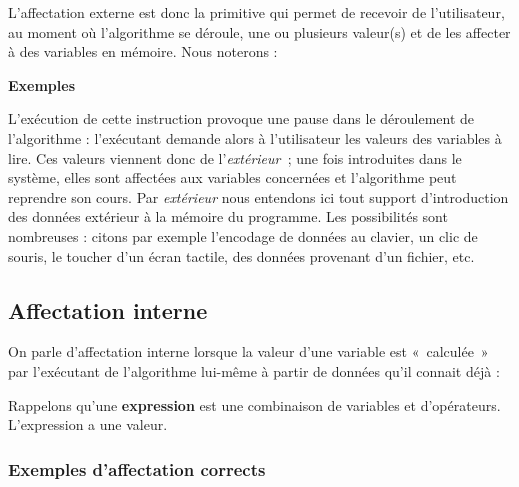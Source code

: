 			L’affectation externe est donc la primitive qui permet de recevoir de
			l’utilisateur, au moment où l'algorithme se déroule,
			une ou plusieurs valeur(s) et de les affecter à des variables en
			mémoire. Nous noterons :

			
			{\bfseries Exemples}
			
			
			L’exécution de cette instruction provoque une
			pause dans le déroulement de l’algorithme : l’exécutant demande alors à
			l’utilisateur les valeurs des variables à lire. Ces valeurs viennent
			donc de l’\textit{extérieur~}; une fois introduites dans le système,
			elles sont affectées aux variables concernées et l’algorithme peut
			reprendre son cours. Par \textit{extérieur} nous entendons ici tout
			support d’introduction des données extérieur à la mémoire du programme.
			Les possibilités sont nombreuses : citons par exemple l’encodage de
			données au clavier, un clic de souris, le toucher d'un
			écran tactile, des données provenant d’un fichier, etc.

		\subsection{Affectation interne }

			On parle d’affectation interne lorsque la valeur d’une variable est
			«~calculée~» par l’exécutant de l’algorithme lui-même à partir de
			données qu’il connait déjà :

			
			Rappelons qu’une \textbf{expression} 
			est une combinaison de variables et
			d’opérateurs. L'expression a une valeur.
			
			\subsubsection*{Exemples d'affectation corrects}
			
			
